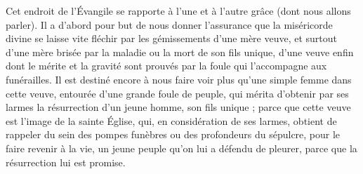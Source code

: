 Cet endroit de l’Évangile se rapporte à l’une et à l’autre grâce (dont nous allons parler). Il a d’abord pour but de nous donner l’assurance que la miséricorde divine se laisse vite fléchir par les gémissements d’une mère veuve, et surtout d’une mère brisée par la maladie ou la mort de son fils unique, d’une veuve enfin dont le mérite et la gravité sont prouvés par la foule qui l’accompagne aux funérailles. Il est destiné encore à nous faire voir plus qu’une simple femme dans cette veuve, entourée d’une grande foule de peuple, qui mérita d’obtenir par ses larmes la résurrection d’un jeune homme, son fils unique ; parce que cette veuve est l’image de la sainte Église, qui, en considération de ses larmes, obtient de rappeler du sein des pompes funèbres ou des profondeurs du sépulcre, pour le faire revenir à la vie, un jeune peuple qu’on lui a défendu de pleurer, parce que la résurrection lui est promise.
